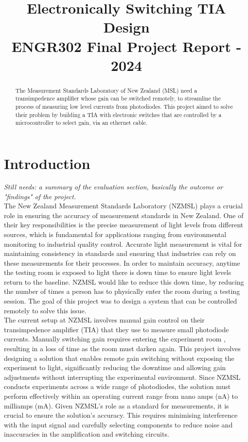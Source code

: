 \documentclass[conference]{IEEEtran}
\title{Electronically Switching TIA Design \\
    \large ENGR302 Final Project Report - 2024}
\author{
    \IEEEauthorblockN{Evgeny Zhilkin, Louis Smith, Mario Pankusz, Max Mawby}
    \IEEEauthorblockA{
        Electrical \& Electronics Engineering \\
        Te Herenga Waka - Victoria University of Wellington \\
        Wellington, Aotearoa New Zealand \\
    }
}
\begin{document}
\maketitle

\begin{abstract}

The Measurement Standards Laboratory of New Zealand (MSL) need a transimpedence amplifier whose gain can be switched remotely, to streamline the process of measuring low level currents from photodiodes. This project aimed to solve their problem by building a TIA with electronic switches that are controlled by a microcontroller to select gain, via an ethernet cable.\\

\end{abstract}


\section{Introduction}

\textit{Still needs: a summary of the evaluation section, basically the outcome or "findings" of the project.} \\

The New Zealand Measurement Standards Laboratory (NZMSL) plays a crucial role in ensuring the accuracy of measurement standards in New Zealand. One of their key responsibilities is the precise measurement of light levels from different sources, which is fundamental for applications ranging from environmental monitoring to industrial quality control. Accurate light measurement is vital for maintaining consistency in standards and ensuring that industries can rely on these measurements for their processes. In order to maintain accuracy, anytime the testing room is exposed to light there is down time to ensure light levels return to the baseline. NZMSL would like to reduce this down time, by reducing the number of times a person has to physically enter the room during a testing session. The goal of this project was to design a system that can be controlled remotely to solve this issue. \\

The current setup at NZMSL involves manual gain control on their transimpedence amplifier (TIA) that they use to measure small photodiode currents. Manually switching gain requires entering the experiment room , resulting in a loss of time as the room must darken again. This project involves designing a solution that enables remote gain switching without exposing the experiment to light, significantly reducing the downtime and allowing gain adjustments without interrupting the experimental environment.
Since NZMSL conducts experiments across a wide range of photodiodes, the solution must perform effectively within an operating current range from nano amps (nA) to milliamps (mA). Given NZMSL's role as a standard for measurements, it is crucial to ensure the solution's accuracy. This requires minimising interference with the input signal and carefully selecting components to reduce noise and inaccuracies in the amplification and switching circuits. \\
\end{document}
